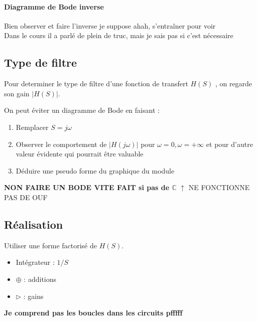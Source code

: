 \documentclass{article}
\theoremstyle{plain}%
\theoremstyle{definition}
\theoremstyle{remark}
\begin{document}
\paragraph*{Diagramme de Bode inverse}
Bien observer et faire l'inverse je suppose ahah, s'entraîner pour voir \\
Dans le cours il a parlé de plein de truc, mais je sais pas si c'est nécessaire

\subsection{Type de filtre}
Pour determiner le type de filtre d'une fonction de transfert $ H(S) $ , on regarde son gain $ \left| H(S) \right| $.

On peut éviter un diagramme de Bode en faisant : 
\begin{enumerate}
    \item Remplacer $ S=j \omega  $ 
    \item Observer le comportement de $ \left| H(j \omega ) \right|  $ pour $ \omega = 0, \omega =+\infty  $  et pour d'autre valeur évidente qui pourrait être valuable
    \item Déduire une pseudo forme du graphique du module
\end{enumerate}

\textbf{NON FAIRE UN BODE VITE FAIT si pas de $ \mathbb{C} $ } $ \uparrow  $ NE FONCTIONNE PAS DE OUF 

\subsection{Réalisation}
Utiliser une forme factorisé de $ H(S) $. \begin{itemize}
    \item Intégrateur : $ 1/S $ 
    \item $ \oplus $ : additions
    \item $ \rhd $ : gains
\end{itemize}
\textbf{Je comprend pas les boucles dans les circuits pfffff}
\end{document}
